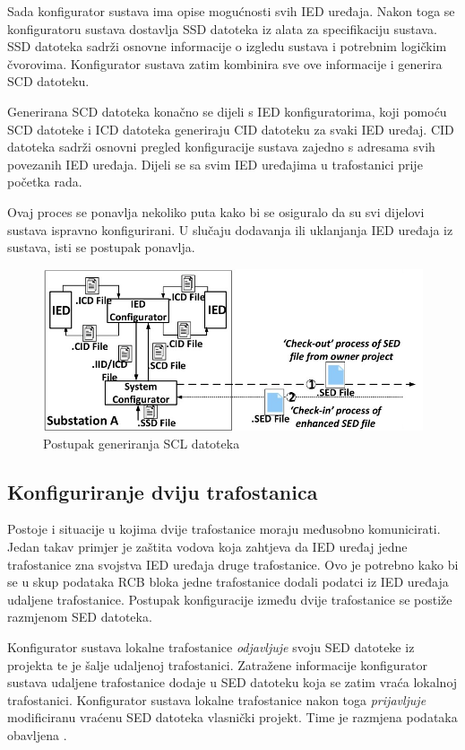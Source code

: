 \documentclass[times, utf8, zavrsni]{fer}
\begin{document}
\smallskip
Sada konfigurator sustava ima opise mogućnosti svih IED uređaja. Nakon toga se konfiguratoru sustava dostavlja SSD datoteka iz alata za specifikaciju sustava. SSD datoteka sadrži osnovne informacije o izgledu sustava i potrebnim logičkim čvorovima. Konfigurator sustava zatim kombinira sve ove informacije i generira SCD datoteku.

\smallskip
Generirana SCD datoteka konačno se dijeli s IED konfiguratorima, koji pomoću SCD datoteke i ICD datoteka generiraju CID datoteku za svaki IED uređaj. CID datoteka sadrži osnovni pregled konfiguracije sustava zajedno s adresama svih povezanih IED uređaja. Dijeli se sa svim IED uređajima u trafostanici prije početka rada.

\smallskip
Ovaj proces se ponavlja nekoliko puta kako bi se osiguralo da su svi dijelovi sustava ispravno konfigurirani. U slučaju dodavanja ili uklanjanja IED uređaja iz sustava, isti se postupak ponavlja.

\begin{figure}[tph]
    \centering
    \includegraphics[scale=0.5]{img/IEC61850-SCL.jpg}
    \caption{Postupak generiranja SCL datoteka\footnotemark}
    \label{fig:iec-scl}
\end{figure}

\subsection{Konfiguriranje dviju trafostanica}
Postoje i situacije u kojima dvije trafostanice moraju međusobno komunicirati. Jedan takav primjer je zaštita vodova koja zahtjeva da IED uređaj jedne trafostanice zna svojstva IED uređaja druge trafostanice. Ovo je potrebno kako bi se u skup podataka RCB bloka jedne trafostanice dodali podatci iz IED uređaja udaljene trafostanice. Postupak konfiguracije između dvije trafostanice se postiže razmjenom SED datoteka.

\smallskip
Konfigurator sustava lokalne trafostanice \textit{odjavljuje}  svoju SED datoteke iz projekta te je šalje udaljenoj trafostanici. Zatražene informacije konfigurator sustava udaljene trafostanice dodaje u SED datoteku koja se zatim vraća lokalnoj trafostanici. Konfigurator sustava lokalne trafostanice nakon toga \textit{prijavljuje}  modificiranu vraćenu SED datoteka vlasnički projekt. Time je razmjena podataka obavljena \citep{aftab2019novel}.
\end{document}
